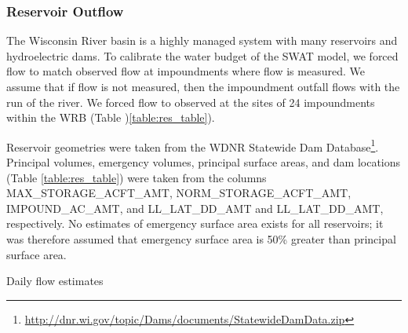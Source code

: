 \subsubsection{Reservoir Outflow}

The Wisconsin River basin is a highly managed system with many reservoirs and hydroelectric dams. To calibrate the water budget of the SWAT model, we forced flow to match observed flow at impoundments where flow is measured. We assume that if flow is not measured, then the impoundment outfall flows with the run of the river. We forced flow to observed at the sites of 24 impoundments within the WRB (Table )\ref{table:res_table}).

\begin{landscape}

\end{landscape}

Reservoir geometries were taken from the WDNR Statewide Dam Database\footnote{\url{http://dnr.wi.gov/topic/Dams/documents/StatewideDamData.zip}}. Principal volumes, emergency volumes, principal surface areas, and dam locations (Table \ref{table:res_table}) were taken from the columns MAX\_STORAGE\_ACFT\_AMT, NORM_STORAGE_ACFT_AMT, IMPOUND\_AC\_AMT, and LL\_LAT\_DD\_AMT and LL\_LAT\_DD\_AMT, respectively. No estimates of emergency surface area exists for all reservoirs; it was therefore assumed that emergency surface area is 50\% greater than principal surface area.

Daily flow estimates 

